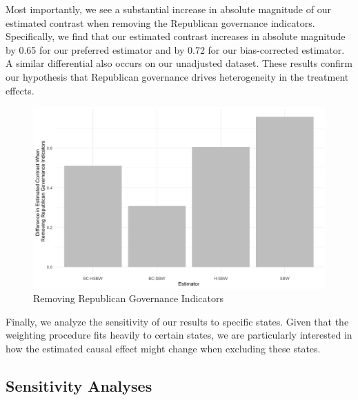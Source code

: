 \documentclass[12pt]{article}
\begin{document}
Most importantly, we see a substantial increase in absolute magnitude of our estimated contrast when removing the Republican governance indicators. Specifically, we find that our estimated contrast increases in absolute magnitude by 0.65 for our preferred estimator and by 0.72 for our bias-corrected estimator. A similar differential also occurs on our unadjusted dataset. These results confirm our hypothesis that Republican governance drives heterogeneity in the treatment effects.

\begin{figure}[]
\begin{center}
    \includegraphics[scale=0.6]{01_Plots/repub-diff-c1.png}
    \caption{Removing Republican Governance Indicators}
    \label{repub}
\end{center}
\end{figure}

Finally, we analyze the sensitivity of our results to specific states. Given that the weighting procedure fits heavily to certain states, we are particularly interested in how the estimated causal effect might change when excluding these states.

\subsection{Sensitivity Analyses}
\end{document}
